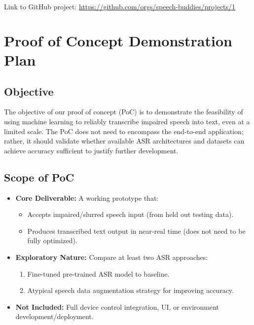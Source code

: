 \documentclass{article}
\begin{document}
Link to GitHub project: \url{https://github.com/orgs/speech-buddies/projects/1}

\section{Proof of Concept Demonstration Plan}


\subsection{Objective}

The objective of our proof of concept (PoC) is to demonstrate the feasibility of using machine learning to reliably transcribe impaired speech into text, even at a limited scale. The PoC does not need to encompass the end-to-end application; rather, it should validate whether available ASR architectures and datasets can achieve accuracy sufficient to justify further development.

\subsection{Scope of PoC}

\begin{itemize}
    \item \textbf{Core Deliverable:} A working prototype that:
    \begin{itemize}
        \item Accepts impaired/slurred speech input (from held out testing data).
        \item Produces transcribed text output in near-real time (does not need to be fully optimized).
    \end{itemize}
    
    \item \textbf{Exploratory Nature:} Compare at least two ASR approaches:
    \begin{enumerate}
        \item Fine-tuned pre-trained ASR model to baseline.
        \item Atypical speech data augmentation strategy for improving accuracy.
    \end{enumerate}
    
    \item \textbf{Not Included:} Full device control integration, UI, or environment development/deployment.
\end{itemize}
\end{document}
